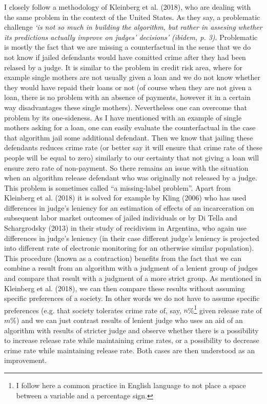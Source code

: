 \documentclass[12pt, twoside,openany]{book} %
\begin{document}
I closely follow a methodology of Kleinberg et al. (2018), who are dealing with the same problem in the context of the United States. As they say, a problematic challenge \textit{‘is not so much in building the algorithm, but rather in assesing whether its predictions actually improve on judges' decisions’ (\textit{ibidem}, p. 3)}. Problematic is mostly the fact that we are missing a counterfactual in the sense that we do not know if jailed defendants would have comitted crime after they had been relased by a judge. It is similar to the problem in credit risk area, where for example single mothers are not usually given a loan and we do not know whether they would have repaid their loans or not (of course when they are not given a loan, there is no problem with an absence of payments, however it in a certain way disadvantages these single mothers). Nevertheless one can overcome that problem by its one-sideness. As I have mentioned with an example of single mothers asking for a loan, one can easily evaluate the counterfactual in the case that algorithm jail some additional  defendant. Then we know that jailing these defendants reduces crime rate (or better say it will ensure that crime rate of these people will be equal to zero) similarly to our certainty that not giving a loan will ensure zero rate of non-payment. So there remains an issue with the situation when an algorithm release defendant who was originally not released by a judge. This problem is sometimes called “a missing-label problem”. Apart from Kleinberg et al. (2018) it is solved for example by Kling (2006) who has used differences in judge's leniency for an estimation of effects of an incarceration on subsequent labor market outcomes of jailed individuals or by Di Tella and Schargrodsky (2013) in their study of recidivism in Argentina, who again use differences in judge's leniency (in their case different judge's leniency is projected into different rate of electronic monitoring for an otherwise similar population). This procedure (known as a contraction) benefits from the fact that we can combine a result from an algorithm with a judgment of a lenient group of judges and compare that result with a judgment of a more strict group. As mentioned in Kleinberg et al. (2018), we can then compare these results without assuming specific preferences of a society. In other words we do not have to assume specific preferences (e.g. that society tolerates crime rate of, say, $n$\%\footnote{I follow here a common practice in English language to not place a space between a variable and a percentage sign.} given release rate of $m$\%) and we can just contrast results of lenient judge who uses an aid of an algorithm with results of stricter judge and observe whether there is a possibility to increase release rate while maintaining crime rates, or a possibility to decrease crime rate while maintaining release rate. Both cases are then understood as an improvement.\newline
\end{document}
